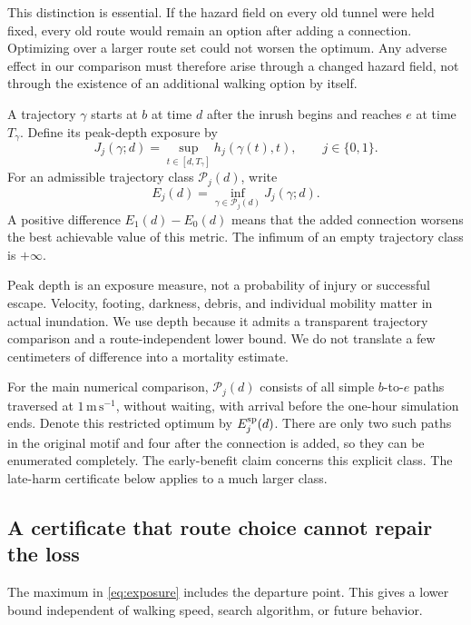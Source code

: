 \documentclass[11pt]{article}
\newcommand{\Paths}{\mathcal P}
\begin{document}
This distinction is essential. If the hazard field on every old tunnel were held fixed, every old route would remain an option after adding a connection. Optimizing over a larger route set could not worsen the optimum. Any adverse effect in our comparison must therefore arise through a changed hazard field, not through the existence of an additional walking option by itself.

A trajectory \(\gamma\) starts at \(b\) at time \(d\) after the inrush begins and reaches \(e\) at time \(T_\gamma\). Define its peak-depth exposure by
\begin{equation}
  J_j(\gamma;d)=\sup_{t\in[d,T_\gamma]}h_j(\gamma(t),t),
  \qquad j\in\{0,1\}.                                      \label{eq:exposure}
\end{equation}
For an admissible trajectory class \(\Paths_j(d)\), write
\begin{equation}
  E_j(d)=\inf_{\gamma\in\Paths_j(d)}J_j(\gamma;d).
                                                               \label{eq:optimum}
\end{equation}
A positive difference \(E_1(d)-E_0(d)\) means that the added connection worsens the best achievable value of this metric. The infimum of an empty trajectory class is \(+\infty\).

Peak depth is an exposure measure, not a probability of injury or successful escape. Velocity, footing, darkness, debris, and individual mobility matter in actual inundation. We use depth because it admits a transparent trajectory comparison and a route-independent lower bound. We do not translate a few centimeters of difference into a mortality estimate.

For the main numerical comparison, \(\Paths_j(d)\) consists of all simple \(b\)-to-\(e\) paths traversed at \(1\,\mathrm{m\,s^{-1}}\), without waiting, with arrival before the one-hour simulation ends. Denote this restricted optimum by \(E_j^{\rm sp}(d)\). There are only two such paths in the original motif and four after the connection is added, so they can be enumerated completely. The early-benefit claim concerns this explicit class. The late-harm certificate below applies to a much larger class.

\subsection{A certificate that route choice cannot repair the loss}
The maximum in \eqref{eq:exposure} includes the departure point. This gives a lower bound independent of walking speed, search algorithm, or future behavior.
\end{document}
